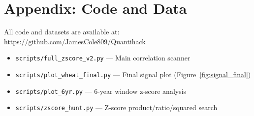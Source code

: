 \documentclass[12pt,a4paper]{article}
\begin{document}
\section*{Appendix: Code and Data}

All code and datasets are available at: \url{https://github.com/JamesCole809/Quantihack}

\begin{itemize}[nosep]
    \item \texttt{scripts/full\_zscore\_v2.py} --- Main correlation scanner
    \item \texttt{scripts/plot\_wheat\_final.py} --- Final signal plot (Figure~\ref{fig:signal_final})
    \item \texttt{scripts/plot\_6yr.py} --- 6-year window z-score analysis
    \item \texttt{scripts/zscore\_hunt.py} --- Z-score product/ratio/squared search
\end{itemize}
\end{document}
